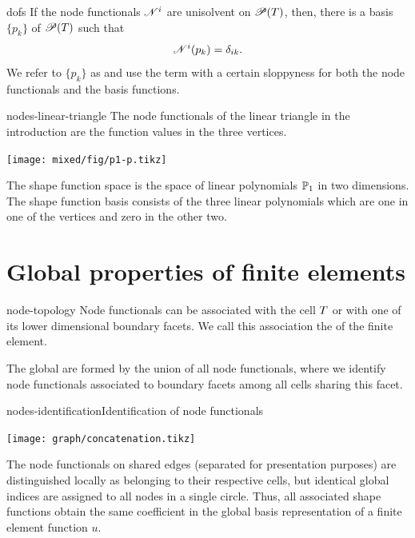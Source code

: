 \begin{Notation}{dofs}
  If the node functionals $\nodal^i$ are unisolvent on
  $\shapespace(\cell)$, then, there is a basis $\{p_k\}$ of $\shapespace(\cell)$
  such that
  \begin{gather}
    \nodal^i(p_k) = \delta_{ik}.
  \end{gather}
  We refer to $\{p_k\}$ as  and use the
  term  with a certain sloppyness for both the node functionals and
  the basis functions.
\end{Notation}

\begin{Example}{nodes-linear-triangle}
  The node functionals of the linear triangle in the introduction are the function values in the three vertices.
  \begin{center}
    \texttt{[image: mixed/fig/p1-p.tikz]}    
  \end{center}
  The shape function space is the space of linear polynomials $\P_1$
  in two dimensions. The shape function basis consists of the three
  linear polynomials which are one in one of the vertices and zero in
  the other two.
\end{Example}

\section{Global properties of finite elements}

\begin{Definition}{node-topology}
  Node functionals can be associated with the cell $\cell$ or with one
  of its lower dimensional boundary facets. We call this association
  the  of the finite element.

  The global  are formed by the union of all
  node functionals, where we identify node functionals associated to
  boundary facets among all cells sharing this facet.  
\end{Definition}

\begin{Example*}{nodes-identification}{Identification of node functionals}
  \begin{center}
    \texttt{[image: graph/concatenation.tikz]}    
  \end{center}
  The node functionals on
    shared edges (separated for presentation purposes) are
    distinguished locally as belonging to their respective cells, but
    identical global indices are assigned to all nodes in a single
    circle. Thus, all associated shape functions obtain the same
    coefficient in the global basis representation of a finite element
    function $u$.
\end{Example*}

